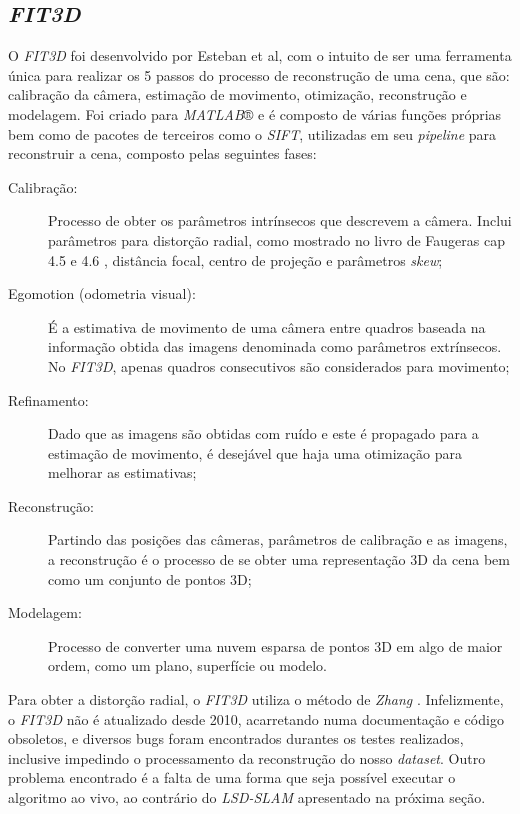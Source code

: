 \subsection{\textit{FIT3D}}
O \textit{FIT3D} foi desenvolvido por Esteban et al\cite{FIT3D}, com o intuito de ser uma ferramenta única para realizar os 5 passos do processo de reconstrução de uma cena, que são: calibração da câmera, estimação de movimento, otimização, reconstrução e modelagem. Foi criado para \textit{MATLAB}® e é composto de várias funções próprias bem como de pacotes de terceiros como o \textit{SIFT}, utilizadas em seu \textit{pipeline} para reconstruir a cena, composto pelas seguintes fases:
\begin{description}
 \item[Calibração: ]{Processo de obter os parâmetros intrínsecos que descrevem a câmera. Inclui parâmetros para distorção radial, como mostrado no livro de Faugeras cap 4.5 e 4.6 \cite{Faugeras-Geometry}, distância focal, centro de projeção e parâmetros \textit{skew};}
 \item[Egomotion (odometria visual): ]{É a estimativa de movimento de uma câmera entre quadros baseada na informação obtida das imagens denominada como parâmetros extrínsecos. No \textit{FIT3D}, apenas quadros consecutivos são considerados para movimento;}
 \item[Refinamento: ]{Dado que as imagens são obtidas com ruído e este é propagado para a estimação de movimento, é desejável que haja uma otimização para melhorar as estimativas;}
 \item[Reconstrução: ]{Partindo das posições das câmeras, parâmetros de calibração e as imagens, a reconstrução é o processo de se obter uma representação 3D da cena bem como um conjunto de pontos 3D;}
 \item[Modelagem: ]{Processo de converter uma nuvem esparsa de pontos 3D em algo de maior ordem, como um plano, superfície ou modelo.}
\end{description}
  
 Para obter a distorção radial, o \textit{FIT3D} utiliza o método de \textit{Zhang} \cite{FIT3D}. Infelizmente, o \textit{FIT3D} não é atualizado desde 2010, acarretando numa documentação e código obsoletos, e diversos bugs foram encontrados durantes os testes realizados, inclusive impedindo o processamento da reconstrução do nosso \textit{dataset}. Outro problema encontrado é a falta de uma forma que seja possível executar o algoritmo ao vivo, ao contrário do \textit{LSD-SLAM} apresentado na próxima seção.


